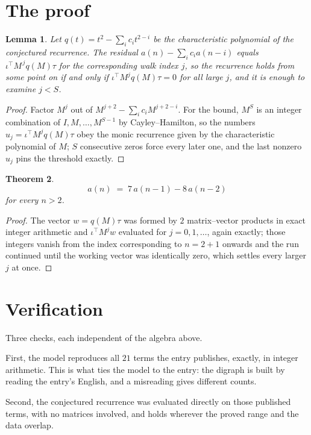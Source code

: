 \documentclass[11pt,a4paper]{article}
\theoremstyle{plain}
\newtheorem{theorem}{Theorem}
\newtheorem{lemma}[theorem]{Lemma}
\theoremstyle{definition}
\begin{document}
\section{The proof}

\begin{lemma}\label{lem:crit}
Let $q(t)=t^{2}-\sum_i c_it^{2-i}$ be the characteristic polynomial of the
conjectured recurrence. The residual $a(n)-\sum_ic_ia(n-i)$ equals
$\iota^{\!\top}M^{\,j}q(M)\tau$ for the corresponding walk index $j$, so the recurrence
holds from some point on if and only if $\iota^{\!\top}M^{j}q(M)\tau=0$ for all large $j$,
and it is enough to examine $j<S$.
\end{lemma}

\begin{proof}
Factor $M^{j}$ out of $M^{j+2}-\sum_ic_iM^{j+2-i}$. For the bound, $M^{S}$
is an integer combination of $I,M,\dots,M^{S-1}$ by Cayley--Hamilton, so the numbers
$u_j=\iota^{\!\top}M^{j}q(M)\tau$ obey the monic recurrence given by the characteristic
polynomial of $M$; $S$ consecutive zeros force every later one, and the last nonzero $u_j$
pins the threshold exactly.
\end{proof}

\begin{theorem}
\[
a(n)\;=\;7\,a(n-1) - 8\,a(n-2)
\]
for every $n>2$.
\end{theorem}

\begin{proof}
The vector $w=q(M)\tau$ was formed by $2$ matrix--vector products in exact integer
arithmetic and $\iota^{\!\top}M^{j}w$ evaluated for $j=0,1,\dots$, again exactly; those
integers vanish from the index corresponding to $n=2+1$ onwards and the run continued
until the working vector was identically zero, which settles every larger $j$ at once.
\end{proof}

\section{Verification}

Three checks, each independent of the algebra above.

First, the model reproduces all $21$ terms the entry publishes, exactly, in integer
arithmetic. This is what ties the model to the entry: the digraph is built by reading the
entry's English, and a misreading gives different counts.

Second, the conjectured recurrence was evaluated directly on those published terms, with no
matrices involved, and holds wherever the proved range and the data overlap.
\end{document}
